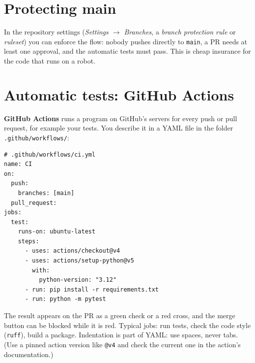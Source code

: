 \section*{Protecting main}
In the repository settings (\emph{Settings $\rightarrow$ Branches}, a \emph{branch protection rule} or \emph{ruleset}) you can enforce the flow: nobody pushes directly to \texttt{main}, a PR needs at least one approval, and the automatic tests must pass. This is cheap insurance for the code that runs on a robot.

\section*{Automatic tests: GitHub Actions}
\textbf{GitHub Actions} runs a program on GitHub's servers for every push or pull request, for example your tests. You describe it in a YAML file in the folder \texttt{.github/workflows/}:
\begin{verbatim}
# .github/workflows/ci.yml
name: CI
on:
  push:
    branches: [main]
  pull_request:
jobs:
  test:
    runs-on: ubuntu-latest
    steps:
      - uses: actions/checkout@v4
      - uses: actions/setup-python@v5
        with:
          python-version: "3.12"
      - run: pip install -r requirements.txt
      - run: python -m pytest
\end{verbatim}
The result appears on the PR as a green check or a red cross, and the merge button can be blocked while it is red. Typical jobs: run tests, check the code style (\texttt{ruff}), build a package. Indentation is part of YAML: use spaces, never tabs. (Use a pinned action version like \texttt{@v4} and check the current one in the action's documentation.)


